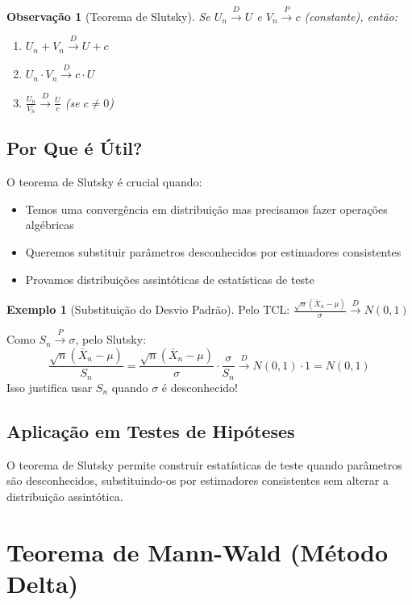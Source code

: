 \documentclass[12pt,a4paper]{article}
\theoremstyle{definition}
\newtheorem{exemplo}{Exemplo}[section]
\theoremstyle{plain}
\newtheorem{observacao}{Observação}[section]
\begin{document}
\begin{observacao}[Teorema de Slutsky]
Se $U_n \xrightarrow{D} U$ e $V_n \xrightarrow{P} c$ (constante), então:
\begin{enumerate}
    \item $U_n + V_n \xrightarrow{D} U + c$
    \item $U_n \cdot V_n \xrightarrow{D} c \cdot U$
    \item $\frac{U_n}{V_n} \xrightarrow{D} \frac{U}{c}$ (se $c \neq 0$)
\end{enumerate}
\end{observacao}

\subsection{Por Que é Útil?}

O teorema de Slutsky é crucial quando:
\begin{itemize}
    \item Temos uma convergência em distribuição mas precisamos fazer operações algébricas
    \item Queremos substituir parâmetros desconhecidos por estimadores consistentes
    \item Provamos distribuições assintóticas de estatísticas de teste
\end{itemize}

\begin{exemplo}[Substituição do Desvio Padrão]
Pelo TCL: $\frac{\sqrt{n}(\bar{X}_n - \mu)}{\sigma} \xrightarrow{D} N(0,1)$

Como $S_n \xrightarrow{P} \sigma$, pelo Slutsky:
\[
\frac{\sqrt{n}(\bar{X}_n - \mu)}{S_n} = \frac{\sqrt{n}(\bar{X}_n - \mu)}{\sigma} \cdot \frac{\sigma}{S_n} \xrightarrow{D} N(0,1) \cdot 1 = N(0,1)
\]
Isso justifica usar $S_n$ quando $\sigma$ é desconhecido!
\end{exemplo}

\subsection{Aplicação em Testes de Hipóteses}

O teorema de Slutsky permite construir estatísticas de teste quando parâmetros são desconhecidos, substituindo-os por estimadores consistentes sem alterar a distribuição assintótica.

\section{Teorema de Mann-Wald (Método Delta)}
\end{document}
